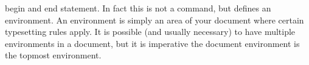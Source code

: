 
    \begin{environment1}
        \begin{environment2}
              begin and end statement. In fact this is not a command, but defines an environment. An environment is simply an area of your document where certain typesetting rules apply. It is possible (and usually necessary) to have multiple environments in a document, but it is imperative the document environment is the topmost environment.
        \end{environment2}
    \end{environment1}

